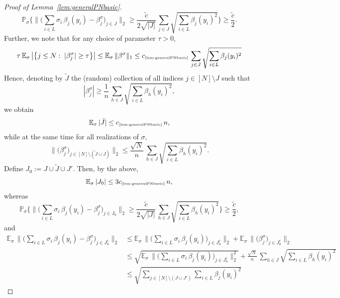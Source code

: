 \documentclass[11pt]{amsart}
\theoremstyle{definition}
\theoremstyle{plain}
\def\Prob{{\mathbb P}}
\def\Prob{{\mathbb P}}
\def\Exp{{\mathbb E}}
\begin{document}
\begin{proof}[Proof of Lemma~\ref{lem:generalPNbasic}]
\begin{equation*}
\Prob_\sigma\bigg\{
\Big\|
\Big(\sum_{i\in L}\sigma_i\,\beta_j(y_i)-\beta^\sigma_j\Big)_{j\in J}\Big\|_2
\geq 
\frac{\tilde c}{2\sqrt{|J|}}\,\sum_{j\in J}\sqrt{\sum_{i\in L}\beta_j(y_i)^2}
\bigg\}
\geq \frac{\tilde c}{2}.
    \end{equation*}
    Further, we note that for any choice of parameter $\tau>0$,
    $$
    \tau\,\Exp_\sigma\,\big|\big\{j\leq N:\;|\beta^\sigma_j|\geq \tau\big\}\big|
    \leq \Exp_{\sigma}\,\|\beta^\sigma\|_1
    \leq
    c_{\text{\tiny\ref{lem:generalPNbasic}}}\,
    \sum_{j\in J}\sqrt{\sum_{i\in L}\beta_j(y_i)^2}
    $$
    Hence, denoting by $\tilde J$ the (random)
    collection of all indices
    $j\in [N]\setminus J$ such that
    $$
    |\beta^\sigma_j|\geq
    \frac{1}{n}\,
    \sum_{h\in J}\sqrt{\sum_{i\in L}\beta_h(y_i)^2},
    $$
    we obtain
    $$
    \Exp_\sigma\,|\tilde J|
    \leq c_{\text{\tiny\ref{lem:generalPNbasic}}}\,n,
    $$
    while at the same time for all realizations of $\sigma$,
    $$
    \Big\|\big(\beta^\sigma_j\big)_{
    j\in [N]\setminus(\tilde J\cup J)}\Big\|_2
    \leq
    \frac{\sqrt{N}}{n}\,
    \sum_{h\in J}\sqrt{\sum_{i\in L}\beta_h(y_i)^2}.
    $$
    Define $J_0:=J\cup \tilde J\cup J'$.
    Then, by the above,
    \begin{equation}\label{eq:J0upperbound}
    \Exp_\sigma\,|J_0|\leq 3c_{\text{\tiny\ref{lem:generalPNbasic}}}\,n,
    \end{equation}
    whereas
    \begin{equation}\label{eq:probtildec}
    \Prob_\sigma\bigg\{
\Big\|
\Big(\sum_{i\in L}\sigma_i\,\beta_j(y_i)-\beta^\sigma_j\Big)_{j\in J_0}\Big\|_2
\geq 
\frac{\tilde c}{2\sqrt{|J|}}\,%
\sum_{h\in J}\sqrt{\sum_{i\in L}\beta_h(y_i)^2}
\bigg\}
\geq \frac{\tilde c}{2},
    \end{equation}
    and
    \begin{align}
    \Exp_{\sigma}\,\Big\|
    \Big(\sum_{i\in L}\sigma_i\,\beta_j(y_i)-\beta^\sigma_j\Big)_{j\in J_0^c}\Big\|_2
    &\leq 
    \Exp_{\sigma}\,\Big\|
    \Big(\sum_{i\in L}\sigma_i\,\beta_j(y_i)\Big)_{j\in J_0^c}\Big\|_2
    +
    \Exp_{\sigma}\,\Big\|
    \big(\beta^\sigma_j\big)_{j\in J_0^c}\Big\|_2\nonumber\\
    &\leq
    \sqrt{\Exp_{\sigma}\,\Big\|
    \Big(\sum_{i\in L}\sigma_i\,\beta_j(y_i)\Big)_{j\in J_0^c}\Big\|_2^2}
    +
    \frac{\sqrt{N}}{n}\,
    \sum_{h\in J}\sqrt{\sum_{i\in L}\beta_h(y_i)^2}\nonumber\\
    &\leq
    \sqrt{\sum_{j\in [N]\setminus(J\cup J')}\sum_{i\in L}\beta_j(y_i)^2}

\end{align}
\end{proof}
\end{document}
